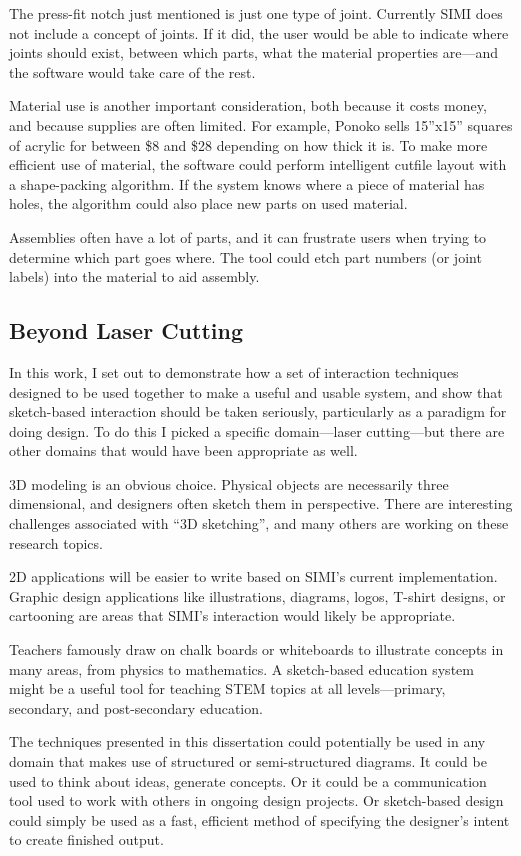 The press-fit notch just mentioned is just one type of
joint. Currently SIMI does not include a concept of joints. If it did,
the user would be able to indicate where joints should exist, between
which parts, what the material properties are---and the software would
take care of the rest.

Material use is another important consideration, both because it costs
money, and because supplies are often limited. For example, Ponoko
sells 15''x15'' squares of acrylic for between \$8 and \$28 depending
on how thick it is. To make more efficient use of material, the
software could perform intelligent cutfile layout with a shape-packing
algorithm. If the system knows where a piece of material has holes,
the algorithm could also place new parts on used material.

Assemblies often have a lot of parts, and it can frustrate users when
trying to determine which part goes where. The tool could etch part
numbers (or joint labels) into the material to aid assembly.

\subsection{Beyond Laser Cutting}

In this work, I set out to demonstrate how a set of interaction
techniques designed to be used together to make a useful and usable
system, and show that sketch-based interaction should be taken
seriously, particularly as a paradigm for doing design. To do this I
picked a specific domain---laser cutting---but there are other domains
that would have been appropriate as well. 

3D modeling is an obvious choice. Physical objects are necessarily
three dimensional, and designers often sketch them in
perspective. There are interesting challenges associated with ``3D
sketching'', and many others are working on these research topics.

2D applications will be easier to write based on SIMI's current
implementation. Graphic design applications like illustrations,
diagrams, logos, T-shirt designs, or cartooning are areas that SIMI's
interaction would likely be appropriate.

Teachers famously draw on chalk boards or whiteboards to illustrate
concepts in many areas, from physics to mathematics. A sketch-based
education system might be a useful tool for teaching STEM topics at
all levels---primary, secondary, and post-secondary education.

The techniques presented in this dissertation could potentially be used
in any domain that makes use of structured or semi-structured
diagrams. It could be used to think about ideas, generate concepts. Or
it could be a communication tool used to work with others in ongoing
design projects. Or sketch-based design could simply be used as a
fast, efficient method of specifying the designer's intent to create
finished output.


